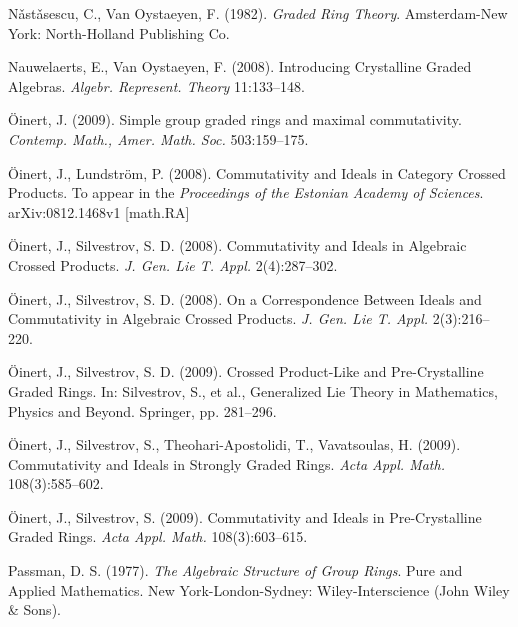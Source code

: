\documentclass[11pt,leqno]{amsart}
\theoremstyle{plain}
\theoremstyle{definition}
\begin{document}
\begin{thebibliography}{99}
N{\v a}st{\v a}sescu, C.,
Van Oystaeyen, F. (1982).
{\it Graded Ring Theory}.
Amsterdam-New York: North-Holland Publishing Co.

Nauwelaerts, E.,
Van Oystaeyen, F. (2008).
Introducing Crystalline Graded Algebras.
{\it Algebr. Represent. Theory} 11:133--148.

\"{O}inert, J. (2009).
Simple group graded rings and maximal commutativity.
{\it Contemp. Math., Amer. Math. Soc.} 503:159--175.

\"{O}inert, J., Lundstr\"{o}m,  P. (2008).
Commutativity and Ideals in Category Crossed Products.
To appear in the {\it Proceedings of the Estonian Academy of Sciences}.
arXiv:0812.1468v1 [math.RA]

\"{O}inert, J.,
Silvestrov, S. D. (2008).
Commutativity and Ideals in Algebraic Crossed Products.
{\it J. Gen. Lie T. Appl.} 2(4):287--302.

\"{O}inert, J.,
Silvestrov, S. D. (2008).
On a Correspondence Between Ideals and Commutativity in Algebraic Crossed Products.
{\it J. Gen. Lie T. Appl.} 2(3):216--220.

\"{O}inert, J., Silvestrov, S. D. (2009).
Crossed Product-Like and Pre-Crystalline Graded Rings.
In: Silvestrov, S., et al., Generalized Lie Theory in Mathematics, Physics and Beyond.
Springer, pp. 281--296.

\"{O}inert, J.,
Silvestrov,  S.,
Theohari-Apostolidi, T.,
Vavatsoulas, H. (2009).
Commutativity and Ideals in Strongly Graded Rings.
{\it Acta Appl. Math.} 108(3):585--602.

\"{O}inert, J.,
Silvestrov, S. (2009).
Commutativity and Ideals in Pre-Crystalline Graded Rings.
{\it Acta Appl. Math.} 108(3):603--615.

Passman, D. S. (1977).
{\it The Algebraic Structure of Group Rings}.
Pure and Applied Mathematics.
New York-London-Sydney: Wiley-Interscience (John Wiley \& Sons).
\end{thebibliography}
\end{document}
